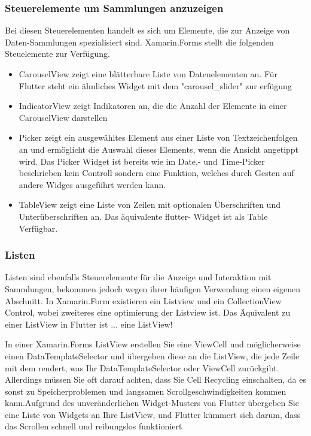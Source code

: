 \subsubsection{Steuerelemente um Sammlungen anzuzeigen}

Bei diesen Steuerelementen handelt es sich um Elemente, die zur Anzeige von Daten-Sammlungen spezialisiert sind.  Xamarin.Forms stellt die folgenden Steuelemente zur Verfügung.

\begin{itemize}
\setlength\itemsep{-0.6em}
 \item CarouselView zeigt eine blätterbare Liste von Datenelementen an.  Für Flutter steht ein ähnliches Widget mit dem "carousel\_slider" zur erfügung
 \item IndicatorView zeigt Indikatoren an, die die Anzahl der Elemente in einer CarouselView darstellen
 \item Picker zeigt ein ausgewähltes Element aus einer Liste von Textzeichenfolgen an und ermöglicht die Auswahl dieses Elements, wenn die Ansicht angetippt wird.  Das Picker Widget ist bereits wie im Date,- und Time-Picker beschrieben kein Controll sondern eine Funktion, welches durch Gesten auf andere Widges ausgeführt werden kann. 
 \item TableView zeigt eine Liste von Zeilen mit optionalen Überschriften und Unterüberschriften an.  Das äquivalente flutter- Widget ist als Table Verfügbar.
\end{itemize}

\subsubsection{Listen}

Listen sind ebenfalls Steuerelemente für die Anzeige und Interaktion mit Sammlungen,  bekommen jedoch wegen ihrer häufigen Verwendung einen eigenen Abschnitt. In Xamarin.Form existieren ein Listview und ein CollectionView Control,  wobei zweiteres eine optimierung der Listview ist.  Das Äquivalent zu einer ListView in Flutter ist ... eine ListView!

In einer Xamarin.Forms ListView erstellen Sie eine ViewCell und möglicherweise einen DataTemplateSelector und übergeben diese an die ListView, die jede Zeile mit dem rendert, was Ihr DataTemplateSelector oder ViewCell zurückgibt. Allerdings müssen Sie oft darauf achten, dass Sie Cell Recycling einschalten, da es sonst zu Speicherproblemen und langsamen Scrollgeschwindigkeiten kommen kann.Aufgrund des unveränderlichen Widget-Musters von Flutter übergeben Sie eine Liste von Widgets an Ihre ListView, und Flutter kümmert sich darum, dass das Scrollen schnell und reibungslos funktioniert

